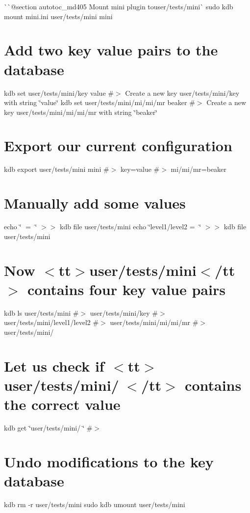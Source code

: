 \`{}\`{}{\ttfamily  @section autotoc\+\_\+md405 Mount mini plugin to}user/tests/mini\`{} sudo kdb mount mini.\+ini user/tests/mini mini\hypertarget{autotoc_md402_autotoc_md406}{}\section{Add two key value pairs to the database}\label{autotoc_md402_autotoc_md406}
kdb set user/tests/mini/key value \#$>$ Create a new key user/tests/mini/key with string \char`\"{}value\char`\"{} kdb set user/tests/mini/mi/mi/mr beaker \#$>$ Create a new key user/tests/mini/mi/mi/mr with string \char`\"{}beaker\char`\"{}\hypertarget{autotoc_md402_autotoc_md407}{}\section{Export our current configuration}\label{autotoc_md402_autotoc_md407}
kdb export user/tests/mini mini \#$>$ key=value \#$>$ mi/mi/mr=beaker\hypertarget{autotoc_md402_autotoc_md408}{}\section{Manually add some values}\label{autotoc_md402_autotoc_md408}
echo \char`\"{}🔑 = 🦄\char`\"{} $>$$>$ {\ttfamily kdb file user/tests/mini} echo \char`\"{}level1/level2 = 👾\char`\"{} $>$$>$ {\ttfamily kdb file user/tests/mini}\hypertarget{autotoc_md402_autotoc_md409}{}\section{Now $<$tt$>$user/tests/mini$<$/tt$>$ contains four key value pairs}\label{autotoc_md402_autotoc_md409}
kdb ls user/tests/mini \#$>$ user/tests/mini/key \#$>$ user/tests/mini/level1/level2 \#$>$ user/tests/mini/mi/mi/mr \#$>$ user/tests/mini/🔑\hypertarget{autotoc_md402_autotoc_md410}{}\section{Let us check if $<$tt$>$user/tests/mini/🔑$<$/tt$>$ contains the correct value}\label{autotoc_md402_autotoc_md410}
kdb get \char`\"{}user/tests/mini/🔑\char`\"{} \#$>$ 🦄\hypertarget{autotoc_md402_autotoc_md411}{}\section{Undo modifications to the key database}\label{autotoc_md402_autotoc_md411}
kdb rm -\/r user/tests/mini sudo kdb umount user/tests/mini 
